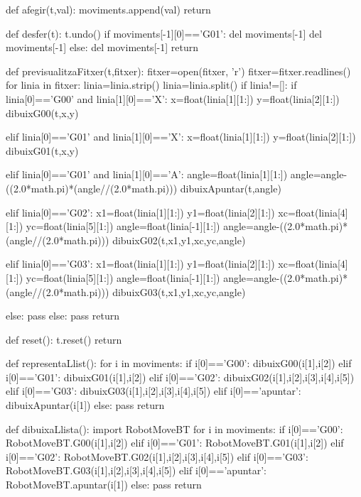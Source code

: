 \begin{python}
	def afegir(t,val):
		moviments.append(val)
		return
	
	def desfer(t):
		t.undo()
		if moviments[-1][0]=='G01':
			del moviments[-1]
			del moviments[-1]
		else:
			del moviments[-1]
		return
	
	
	def previsualitzaFitxer(t,fitxer):
		fitxer=open(fitxer, 'r')
		fitxer=fitxer.readlines()
		for linia in fitxer:
			linia=linia.strip()
			linia=linia.split()
			if linia!=[]:
				if linia[0]=='G00' and linia[1][0]=='X':
					x=float(linia[1][1:])
					y=float(linia[2][1:])
					dibuixG00(t,x,y)
					
				
				elif linia[0]=='G01' and linia[1][0]=='X':
					x=float(linia[1][1:])
					y=float(linia[2][1:])
					dibuixG01(t,x,y)
					
				
				elif linia[0]=='G01' and linia[1][0]=='A':
					angle=float(linia[1][1:])
					angle=angle-((2.0*math.pi)*(angle//(2.0*math.pi)))
					dibuixApuntar(t,angle)
				
				
				elif linia[0]=='G02':
					x1=float(linia[1][1:])
					y1=float(linia[2][1:])
					xc=float(linia[4][1:])
					yc=float(linia[5][1:])
					angle=float(linia[-1][1:])
					angle=angle-((2.0*math.pi)*(angle//(2.0*math.pi)))
					dibuixG02(t,x1,y1,xc,yc,angle)
				
				
				elif linia[0]=='G03':
					x1=float(linia[1][1:])
					y1=float(linia[2][1:])
					xc=float(linia[4][1:])
					yc=float(linia[5][1:])
					angle=float(linia[-1][1:])
					angle=angle-((2.0*math.pi)*(angle//(2.0*math.pi)))
					dibuixG03(t,x1,y1,xc,yc,angle)
				
				
				else:
					pass
			else:
				pass
		return
	
	def reset():
		t.reset()
		return
	
	def representaLlist():
		for i in moviments:
			if i[0]=='G00':
				dibuixG00(i[1],i[2])
			elif i[0]=='G01':
				dibuixG01(i[1],i[2])
			elif i[0]=='G02':
				dibuixG02(i[1],i[2],i[3],i[4],i[5])
			elif i[0]=='G03':
				dibuixG03(i[1],i[2],i[3],i[4],i[5])
			elif i[0]=='apuntar':
				dibuixApuntar(i[1])
			else:
				pass
		return
	
	def dibuixaLlista():
		import RobotMoveBT
		for i in moviments:
			if i[0]=='G00':
				RobotMoveBT.G00(i[1],i[2])
			elif i[0]=='G01':
				RobotMoveBT.G01(i[1],i[2])
			elif i[0]=='G02':
				RobotMoveBT.G02(i[1],i[2],i[3],i[4],i[5])
			elif i[0]=='G03':
				RobotMoveBT.G03(i[1],i[2],i[3],i[4],i[5])
			elif i[0]=='apuntar':
				RobotMoveBT.apuntar(i[1])
			else:
				pass
		return
\end{python}

